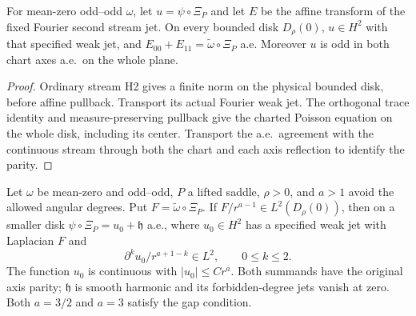 \begin{lemma}
\label{lem:stream-saddle-cylinder-data}
\leanok
For mean-zero odd--odd $\omega$, let $u=\psi\circ\Xi_P$ and let $E$ be
the affine transform of the fixed Fourier second stream jet.
On every bounded disk $D_\rho(0)$, $u\in H^2$ with that specified weak
jet, and $E_{00}+E_{11}=\widetilde\omega\circ\Xi_P$ a.e.
Moreover $u$ is odd in both chart axes a.e.\ on the whole plane.
\end{lemma}

\begin{proof}
\leanok
Ordinary stream H2 gives a finite norm on the physical bounded disk,
before affine pullback. Transport its actual Fourier weak jet.
The orthogonal trace identity and measure-preserving pullback give the
charted Poisson equation on the whole disk, including its center.
Transport the a.e.\ agreement with the continuous stream through both
the chart and each axis reflection to identify the parity.
\end{proof}

\begin{lemma}
\label{lem:stream-saddle-cylinder-inverse}
\leanok
Let $\omega$ be mean-zero and odd--odd, $P$ a lifted saddle, $\rho>0$,
and $a>1$ avoid the allowed angular degrees. Put
$F=\widetilde\omega\circ\Xi_P$.
If $F/r^{a-1}\in L^2(D_\rho(0))$, then on a smaller disk
$\psi\circ\Xi_P=u_0+\mathfrak h$ a.e., where $u_0\in H^2$ has a
specified weak jet with Laplacian $F$ and
\[
 \partial^k u_0/r^{a+1-k}\in L^2,\qquad 0\le k\le2.
\]
The function $u_0$ is continuous with $|u_0|\le Cr^a$.
Both summands have the original axis parity; $\mathfrak h$ is smooth
harmonic and its forbidden-degree jets vanish at zero.
Both $a=3/2$ and $a=3$ satisfy the gap condition.
\end{lemma}

